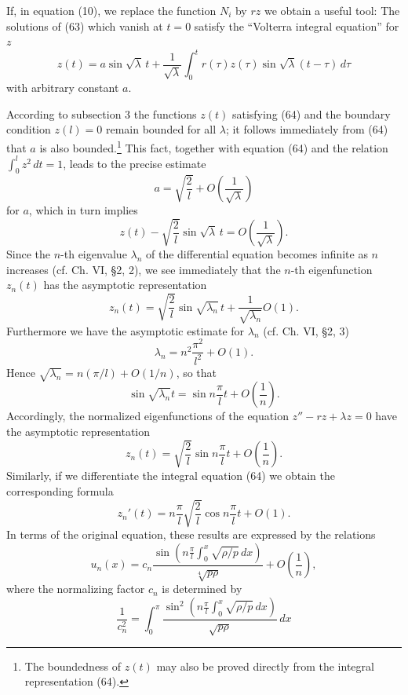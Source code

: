 If, in equation (10), we replace the function $N_i$ by $rz$ we obtain a useful tool: The solutions of (63) which vanish at $t=0$ satisfy the ``Volterra integral equation'' for $z$
\begin{equation}
z(t)=a\sin\sqrt\lambda\,t+\frac1{\sqrt\lambda}\int_0^t r(\tau)z(\tau)\sin\sqrt\lambda(t-\tau)\,d\tau
\tag{64}
\end{equation}
with arbitrary constant $a$.

According to subsection 3 the functions $z(t)$ satisfying (64) and the boundary condition $z(l)=0$ remain bounded for all $\lambda$; it follows immediately from (64) that $a$ is also bounded.\footnote{The boundedness of $z(t)$ may also be proved directly from the integral representation (64).} This fact, together with equation (64) and the relation $\int_0^l z^2\,dt=1$, leads to the precise estimate
\[
a=\sqrt{\frac2l}+O\left(\frac1{\sqrt\lambda}\right)
\]
for $a$, which in turn implies
\[
z(t)-\sqrt{\frac2l}\sin\sqrt\lambda\,t=O\left(\frac1{\sqrt\lambda}\right).
\]
Since the $n$-th eigenvalue $\lambda_n$ of the differential equation becomes infinite as $n$ increases (cf. Ch. VI, \S2, 2), we see immediately that the $n$-th eigenfunction $z_n(t)$ has the asymptotic representation
\[
z_n(t)=\sqrt{\frac2l}\sin\sqrt{\lambda_n}\,t+\frac1{\sqrt{\lambda_n}}O(1).
\]
Furthermore we have the asymptotic estimate for $\lambda_n$ (cf. Ch. VI, \S2, 3)
\[
\lambda_n=n^2\frac{\pi^2}{l^2}+O(1).
\]
Hence $\sqrt{\lambda_n}=n(\pi/l)+O(1/n)$, so that
\[
\sin\sqrt{\lambda_n}t=\sin n\frac\pi l t+O\left(\frac1n\right).
\]
Accordingly, the normalized eigenfunctions of the equation $z''-rz+\lambda z=0$ have the asymptotic representation
\begin{equation}
z_n(t)=\sqrt{\frac2l}\sin n\frac\pi l t+O\left(\frac1n\right).
\tag{65}
\end{equation}
Similarly, if we differentiate the integral equation (64) we obtain the corresponding formula
\begin{equation}
z_n'(t)=n\frac\pi l\sqrt{\frac2l}\cos n\frac\pi l t+O(1).
\tag{66}
\end{equation}
In terms of the original equation, these results are expressed by the relations
\begin{equation}
u_n(x)=c_n\frac{\sin\left(n\frac\pi l\int_0^x\sqrt{\rho/p}\,dx\right)}{\sqrt[4]{p\rho}}+O\left(\frac1n\right),
\tag{67}
\end{equation}
where the normalizing factor $c_n$ is determined by
\[
\frac1{c_n^2}=\int_0^\pi\frac{\sin^2\left(n\frac\pi l\int_0^x\sqrt{\rho/p}\,dx\right)}{\sqrt{p\rho}}\,dx
\]
